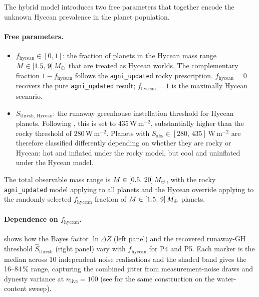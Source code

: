 The hybrid model introduces two free parameters that together encode the
unknown Hycean prevalence in the planet population.

\paragraph{Free parameters.}
\begin{itemize}
    \item $f_\mathrm{hycean} \in [0,1]$: the fraction of planets in the
    Hycean mass range $M \in [1.5,\,9]\,M_{\oplus}$ that are treated as
    Hycean worlds.  The complementary fraction $1-f_\mathrm{hycean}$
    follows the \texttt{agni\_updated} rocky prescription.
    $f_\mathrm{hycean} = 0$ recovers the pure \texttt{agni\_updated} result;
    $f_\mathrm{hycean} = 1$ is the maximally Hycean scenario.
    \item $S_\mathrm{thresh,\,Hycean}$: the runaway greenhouse instellation
    threshold for Hycean planets.  Following \textcite{Innes2023}, this
    is set to $435\,\mathrm{W\,m^{-2}}$, substantially higher than the
    rocky threshold of $280\,\mathrm{W\,m^{-2}}$.  Planets with
    $S_\mathrm{abs} \in [280,\,435]\,\mathrm{W\,m^{-2}}$ are therefore
    classified differently depending on whether they are rocky or Hycean:
    hot and inflated under the rocky model, but cool and uninflated under
    the Hycean model.
\end{itemize}

The total observable mass range is $M \in [0.5,\,20]\,M_{\oplus}$, with the
rocky \texttt{agni\_updated} model applying to all planets and the Hycean
override applying to the randomly selected $f_\mathrm{hycean}$ fraction
of $M \in [1.5,\,9]\,M_{\oplus}$ planets.

\paragraph{Dependence on $f_\mathrm{hycean}$.}
 shows how the Bayes factor
$\ln\Delta Z$ (left panel) and the recovered runaway-GH threshold
$\hat{S}_\mathrm{thresh}$ (right panel) vary with $f_\mathrm{hycean}$
for P4 and P5.  Each marker is the median across $10$ independent
noise realisations and the shaded band gives the 16--84\,\% range,
capturing the combined jitter from measurement-noise draws and dynesty
variance at $n_\mathrm{live}=100$ (see  for the
same construction on the water-content sweep).

